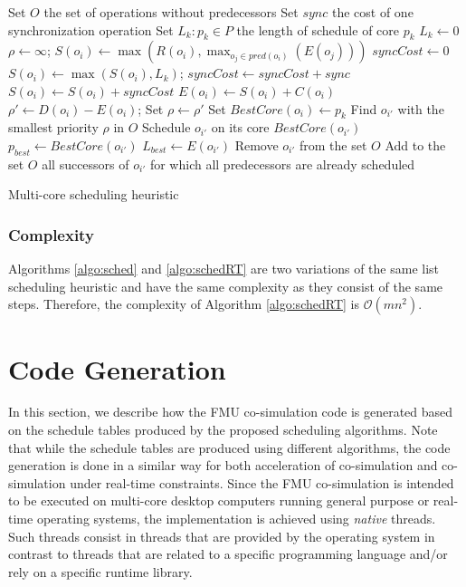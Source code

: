 \begin{algorithm}[!htp]		
 		Set $O$ the set of operations without predecessors\;
		Set $sync$ the cost of one synchronization operation\;
		Set $L_k: p_k \in P$ the length of schedule of core $p_k$\;
		{
			$L_k \leftarrow 0$\;
		}
		{
			{
 				$\rho \leftarrow \infty$; 
				$S(o_i) \leftarrow \max(R(o_i),\max_{o_j \in pred(o_i)}(E(o_j)))$\;
				{
  				$syncCost \leftarrow 0$\;
				$S(o_i) \leftarrow \max(S(o_i) , L_k)$; 
					{
						{
							$syncCost \leftarrow syncCost + sync$\; 
						}
					}
				$S(o_i) \leftarrow S(o_i) + syncCost$\;
				$E(o_i) \leftarrow S(o_i) + C(o_i)$\;
  				$\rho' \leftarrow D(o_i) - E(o_i)$; 
					{
  					Set $\rho \leftarrow \rho'$\;
  					Set $BestCore(o_i) \leftarrow p_k$\;
  				}
  			}
  		 }
  		 Find $o_{i'}$ with the smallest priority $\rho$ in $O$\; 
  		 Schedule $o_{i'}$ on its core $BestCore(o_{i'})$\;
  		 $p_{best} \leftarrow BestCore(o_{i'})$\;
  		 $L_{best} \leftarrow E(o_{i'})$\;
  		 Remove $o_{i'}$ from the set $O$\;
  		 Add to the set $O$ all successors of $o_{i'}$ for which all predecessors are already scheduled\;
		}
	\caption{Multi-core scheduling heuristic}
	\label{algo:schedRT}
\end{algorithm}

\subsubsection{Complexity}

Algorithms \ref{algo:sched} and \ref{algo:schedRT} are two variations of the same list scheduling heuristic and have the same complexity as they consist of the same steps. Therefore, the complexity of Algorithm \ref{algo:schedRT} is $\mathcal{O}(mn^2)$.

\section{Code Generation}

In this section, we describe how the FMU co-simulation code is generated based on the schedule tables produced by the proposed scheduling algorithms. Note that while the schedule tables are produced using different algorithms, the code generation is done in a similar way for both acceleration of co-simulation and co-simulation under real-time constraints. Since the FMU co-simulation is intended to be executed on multi-core desktop computers running general purpose or real-time operating systems, the implementation is achieved using \textit{native} threads. Such threads consist in threads that are provided by the operating system in contrast to threads that are related to a specific programming language and/or rely on a specific runtime library.

